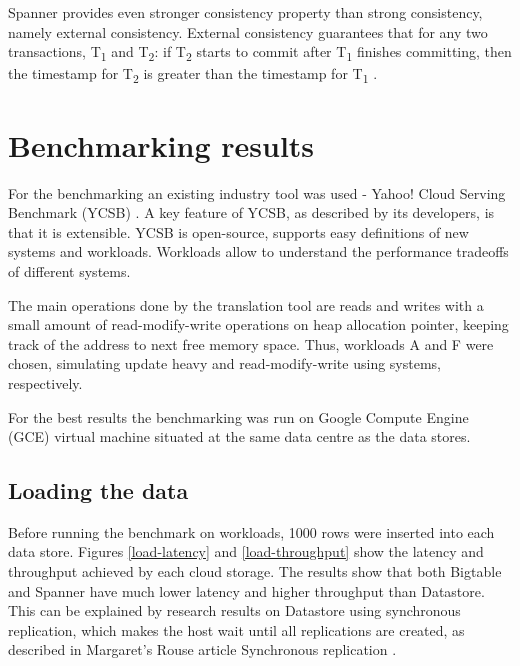 \documentclass[bsc,frontabs,twoside,singlespacing,parskip,deptreport]{infthesis}     %
\begin{document}
Spanner provides even stronger consistency property than strong consistency, namely external consistency. External consistency guarantees that for any two transactions, T\textsubscript{1} and T\textsubscript{2}: if T\textsubscript{2} starts to commit after T\textsubscript{1} finishes committing, then the timestamp for T\textsubscript{2} is greater than the timestamp for T\textsubscript{1} . 

\section{Benchmarking results}

For the benchmarking an existing industry tool was used - Yahoo! Cloud
Serving Benchmark (YCSB) \citep{ycsb}. A key feature of YCSB, as described by its developers, is that it is extensible. YCSB is open-source, supports easy definitions of new systems and workloads. Workloads allow to understand the performance tradeoffs of different systems.

The main operations done by the translation tool are reads and writes with a small amount of read-modify-write operations on heap allocation pointer, keeping track of the address to next free memory space. Thus, workloads A and F were chosen, simulating update heavy and read-modify-write using systems, respectively.

For the best results the benchmarking was run on Google Compute Engine (GCE) virtual machine situated at the same data centre as the data stores.

\subsection{Loading the data}

Before running the benchmark on workloads, 1000 rows were inserted into each data store. Figures \ref{load-latency} and \ref{load-throughput} show the latency and throughput achieved by each cloud storage. The results show that both Bigtable and Spanner have much lower latency and higher throughput than Datastore. This can be explained by research results on Datastore using synchronous replication, which makes the host wait until all replications are created, as described in Margaret's Rouse article Synchronous replication \citep{synchronous-replication}.
\end{document}
